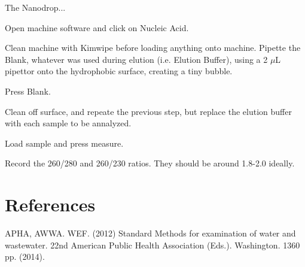\documentclass[12pt]{../SOP3_alpha}
\begin{document}
\NP The Nanodrop...

\NP Open machine software and click on Nucleic Acid.

\NP Clean machine with Kimwipe before loading anything onto machine. 
\NP Pipette the Blank, whatever was used during elution (i.e. Elution Buffer), using a 2 $\mu$L pipettor onto the hydrophobic surface, creating a tiny bubble.

\NP Press Blank.

\NP Clean off surface, and repeate the previous step, but replace the elution buffer with each sample to be annalyzed.

\NP Load sample and press measure.

\NP Record the 260/280 and 260/230 ratios. They should be around 1.8-2.0 ideally. 


\section{References}

\NP APHA, AWWA. WEF. (2012) Standard Methods for examination of water and wastewater. 22nd American Public Health Association (Eds.). Washington. 1360 pp. (2014).
\end{document}
